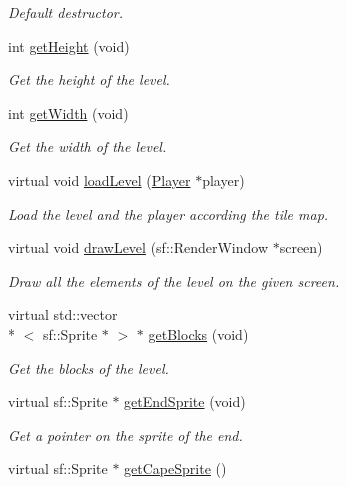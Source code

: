 \begin{DoxyCompactItemize}
\begin{DoxyCompactList}\small\item\em Default destructor. \end{DoxyCompactList}\item 
int \hyperlink{class_level_two_a8c0c117bce3509249967c408b5e077a4}{get\-Height} (void)
\begin{DoxyCompactList}\small\item\em Get the height of the level. \end{DoxyCompactList}\item 
int \hyperlink{class_level_two_a8b5c8339077204363fc53e861710ca5c}{get\-Width} (void)
\begin{DoxyCompactList}\small\item\em Get the width of the level. \end{DoxyCompactList}\item 
virtual void \hyperlink{class_level_two_a71138ffe84dee9ed856a0328f3c72411}{load\-Level} (\hyperlink{class_player}{Player} $\ast$player)
\begin{DoxyCompactList}\small\item\em Load the level and the player according the tile map. \end{DoxyCompactList}\item 
virtual void \hyperlink{class_level_two_a6fbf138025c013260c7f572b41468a24}{draw\-Level} (sf\-::\-Render\-Window $\ast$screen)
\begin{DoxyCompactList}\small\item\em Draw all the elements of the level on the given screen. \end{DoxyCompactList}\item 
virtual std\-::vector\\*
$<$ sf\-::\-Sprite $\ast$ $>$ $\ast$ \hyperlink{class_level_two_a412f81d5b2b93ea6690635cc5ce02c8f}{get\-Blocks} (void)
\begin{DoxyCompactList}\small\item\em Get the blocks of the level. \end{DoxyCompactList}\item 
virtual sf\-::\-Sprite $\ast$ \hyperlink{class_level_two_a981cce04240b7d5bf4e5dc5b8a212319}{get\-End\-Sprite} (void)
\begin{DoxyCompactList}\small\item\em Get a pointer on the sprite of the end. \end{DoxyCompactList}\item 
virtual sf\-::\-Sprite $\ast$ \hyperlink{class_level_two_af9e5022cbec0fe1ec6171231374161dd}{get\-Cape\-Sprite} ()

\end{DoxyCompactItemize}

